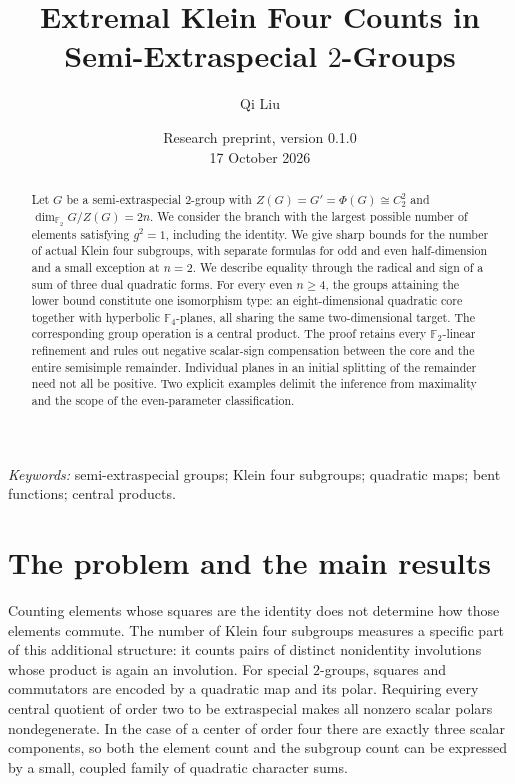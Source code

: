 \documentclass[11pt,a4paper]{article}
\title{Extremal Klein Four Counts in\\ Semi-Extraspecial \(2\)-Groups}
\author{Qi Liu}
\date{Research preprint, version 0.1.0\\17 October 2026}
\theoremstyle{definition}
\theoremstyle{remark}
\numberwithin{equation}{section}
\newcommand{\F}{\mathbb F}
\begin{document}
\maketitle
\begin{abstract}
Let \(G\) be a semi-extraspecial \(2\)-group with
\(Z(G)=G'=\Phi(G)\cong C_2^2\) and
\(\dim_{\F_2}G/Z(G)=2n\).
We consider the branch with the largest possible number of elements
satisfying \(g^2=1\), including the identity.
We give sharp bounds for the number of actual Klein four subgroups,
with separate formulas for odd and even half-dimension and a small
exception at \(n=2\).
We describe equality through the radical and sign of a sum of three
dual quadratic forms. For every even \(n\geq4\), the groups attaining the
lower bound constitute one isomorphism type: an eight-dimensional
quadratic core together with hyperbolic \(\F_4\)-planes, all sharing the
same two-dimensional target. The corresponding group operation is a
central product. The proof retains every \(\F_2\)-linear refinement and
rules out negative scalar-sign compensation between the core and the
entire semisimple remainder. Individual planes in an initial splitting
of the remainder need not all be positive.
Two explicit examples delimit the inference from maximality and the
scope of the even-parameter classification.
\end{abstract}
\noindent\textit{Keywords:} semi-extraspecial groups; Klein four subgroups;
quadratic maps; bent functions; central products.
\par\medskip
{}

\section{The problem and the main results}\label{sec:main}
Counting elements whose squares are the identity does not determine how
those elements commute. The number of Klein four subgroups measures a
specific part of this additional structure: it counts pairs of distinct
nonidentity involutions whose product is again an involution. For special
\(2\)-groups, squares and commutators are encoded by a quadratic map and
its polar. Requiring every central quotient of order two to be
extraspecial makes all nonzero scalar polars nondegenerate. In the case
of a center of order four there are exactly three scalar components,
so both the element count and the subgroup count can be expressed by a
small, coupled family of quadratic character sums.
\end{document}
